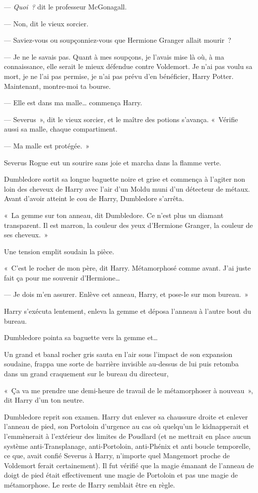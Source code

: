--- \emph{Quoi~?} dit le professeur McGonagall.

--- Non, dit le vieux sorcier.

--- Saviez-vous ou soupçonniez-vous que Hermione Granger allait mourir~?

--- Je ne le savais pas. Quant à mes soupçons, je l'avais mise là où, à ma connaissance, elle serait le mieux défendue contre Voldemort. Je n'ai pas voulu sa mort, je ne l'ai pas permise, je n'ai pas prévu d'en bénéficier, Harry Potter. Maintenant, montre-moi ta bourse.

--- Elle est dans ma malle… commença Harry.

--- Severus~», dit le vieux sorcier, et le maître des potions s'avança. «~Vérifie aussi sa malle, chaque compartiment.

--- Ma malle est protégée.~»

Severus Rogue eut un sourire sans joie et marcha dans la flamme verte.

Dumbledore sortit sa longue baguette noire et grise et commença à l'agiter non loin des cheveux de Harry avec l'air d'un Moldu muni d'un détecteur de métaux. Avant d'avoir atteint le cou de Harry, Dumbledore s'arrêta.

«~La gemme sur ton anneau, dit Dumbledore. Ce n'est plus un diamant transparent. Il est marron, la couleur des yeux d'Hermione Granger, la couleur de ses cheveux.~»

Une tension emplit soudain la pièce.

«~C'est le rocher de mon père, dit Harry. Métamorphosé comme avant. J'ai juste fait ça pour me souvenir d'Hermione…

--- Je dois m'en assurer. Enlève cet anneau, Harry, et pose-le sur mon bureau.~»

Harry s'exécuta lentement, enleva la gemme et déposa l'anneau à l'autre bout du bureau.

Dumbledore pointa sa baguette vers la gemme et…

Un grand et banal rocher gris sauta en l'air sous l'impact de son expansion soudaine, frappa une sorte de barrière invisible au-dessus de lui puis retomba dans un grand craquement sur le bureau du directeur,

«~Ça va me prendre une demi-heure de travail de le métamorphoser à nouveau~», dit Harry d'un ton neutre.

Dumbledore reprit son examen. Harry dut enlever sa chaussure droite et enlever l'anneau de pied, son Portoloin d'urgence au cas où quelqu'un le kidnapperait et l'emmènerait à l'extérieur des limites de Poudlard (et ne mettrait en place aucun système anti-Transplanage, anti-Portoloin, anti-Phénix et anti boucle temporelle, ce que, avait confié Severus à Harry, n'importe quel Mangemort proche de Voldemort ferait certainement). Il fut vérifié que la magie émanant de l'anneau de doigt de pied était effectivement une magie de Portoloin et pas une magie de métamorphose. Le reste de Harry semblait être en règle.

